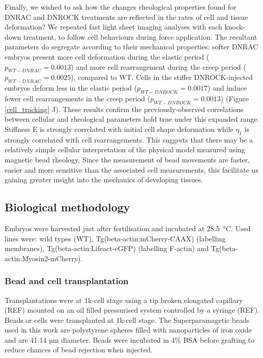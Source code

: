 Finally, we wished to ask how the changes rheological properties found for DNRAC and DNROCK treatments are reflected in the rates of cell and tissue deformation?
We repeated fast light sheet imaging analyses with each knock-down treatment, to follow cell behaviours during force application.
The resultant parameters do segregate according to their mechanical properties: softer DNRAC embryos present more cell deformation during the elastic period ($p_{WT-DNRAC} = 0.0013$) and more cell rearrangement during the creep period ($p_{WT-DNRAC} = 0.0025$), compared to WT.
Cells in the stiffer DNROCK-injected embryos deform less in the elastic period ($p_{WT-DNROCK} = 0.0017$) and induce fewer cell rearrangements in the creep period ($p_{WT-DNROCK} = 0.0013$) (Figure \ref{cell_tracking} J).
These results confirm the previously-observed correlations between cellular and rheological parameters hold true under this expanded range.
Stiffness E is strongly correlated with initial cell shape deformation while $\eta_1$ is strongly correlated with cell rearrangements.
This suggests that there may be a relatively simple cellular interpretation of the physical model measured using magnetic bead rheology.
Since the measurement of bead movements are faster, easier and more sensitive than the associated cell measurements, this facilitate us gaining greater insight into the mechanics of developing tissues.

\subsection{Biological methodology}
Embryos were harvested just after fertilisation and incubated at \SI{28.5}{\celsius}.
Used lines were: wild types (WT), Tg(beta-actin:mCherry-CAAX) (labelling membranes), Tg(beta-actin:Lifeact-eGFP) (labelling F-actin) and Tg(beta-actin:Myosin2-mCherry).

\subsubsection{Bead and cell transplantation}
Transplantations were at 1k-cell stage using a tip broken elongated capillary (REF) mounted on an oil filled pressurised system controlled by a syringe (REF).
Beads or cells were transplanted at 1k-cell stage.
The Superparamagetic beads used in this work are polystyrene spheres filled with nanoparticles of iron oxide and are 41.14 µm diameter.
Beads were incubated in 4\% BSA before grafting to reduce chances of bead rejection when injected.

